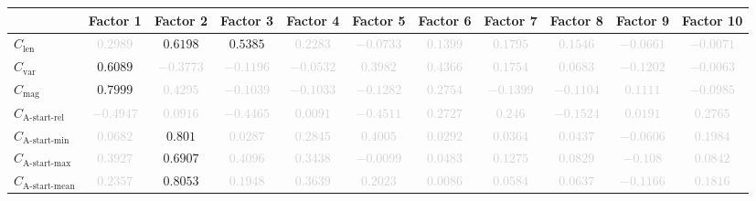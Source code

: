\documentclass{standalone}
\newcommand{\magnitudename}{\text{mag}}
\newcommand{\magnitude}{C_{\magnitudename}}
\newcommand{\varietyname}{\text{var}}
\newcommand{\variety}{C_{\varietyname}}
\newcommand{\lengthname}{\text{len}}
\newcommand{\length}{C_{\lengthname}}
\newcommand{\startactivitiesrelname}{\text{A-start-rel}}
\newcommand{\startactivitiesrel}{C_{\startactivitiesrelname}}
\newcommand{\startminname}{\text{A-start-min}}
\newcommand{\startmin}{C_{\startminname}}
\newcommand{\startmaxname}{\text{A-start-max}}
\newcommand{\startmax}{C_{\startmaxname}}
\newcommand{\startmeanname}{\text{A-start-mean}}
\newcommand{\startmean}{C_{\startmeanname}}
\begin{document}
\begin{tabular}{lcccccccccc} \toprule 
 & \textbf{Factor 1} & \textbf{Factor 2} & \textbf{Factor 3} & \textbf{Factor 4} & \textbf{Factor 5} & \textbf{Factor 6} & \textbf{Factor 7} & \textbf{Factor 8} & \textbf{Factor 9} & \textbf{Factor 10} \\ \midrule 
$\length$ & \textcolor{lightgray}{$0.2989$} & $0.6198$ & $0.5385$ & \textcolor{lightgray}{$0.2283$} & \textcolor{lightgray}{$-0.0733$} & \textcolor{lightgray}{$0.1399$} & \textcolor{lightgray}{$0.1795$} & \textcolor{lightgray}{$0.1546$} & \textcolor{lightgray}{$-0.0661$} & \textcolor{lightgray}{$-0.0071$} \\ 
$\variety$ & $0.6089$ & \textcolor{lightgray}{$-0.3773$} & \textcolor{lightgray}{$-0.1196$} & \textcolor{lightgray}{$-0.0532$} & \textcolor{lightgray}{$0.3982$} & \textcolor{lightgray}{$0.4366$} & \textcolor{lightgray}{$0.1754$} & \textcolor{lightgray}{$0.0683$} & \textcolor{lightgray}{$-0.1202$} & \textcolor{lightgray}{$-0.0063$} \\ 
$\magnitude$ & $0.7999$ & \textcolor{lightgray}{$0.4295$} & \textcolor{lightgray}{$-0.1039$} & \textcolor{lightgray}{$-0.1033$} & \textcolor{lightgray}{$-0.1282$} & \textcolor{lightgray}{$0.2754$} & \textcolor{lightgray}{$-0.1399$} & \textcolor{lightgray}{$-0.1104$} & \textcolor{lightgray}{$0.1111$} & \textcolor{lightgray}{$-0.0985$} \\ 
$\startactivitiesrel$ & \textcolor{lightgray}{$-0.4947$} & \textcolor{lightgray}{$0.0916$} & \textcolor{lightgray}{$-0.4465$} & \textcolor{lightgray}{$0.0091$} & \textcolor{lightgray}{$-0.4511$} & \textcolor{lightgray}{$0.2727$} & \textcolor{lightgray}{$0.246$} & \textcolor{lightgray}{$-0.1524$} & \textcolor{lightgray}{$0.0191$} & \textcolor{lightgray}{$0.2765$} \\ 
$\startmin$ & \textcolor{lightgray}{$0.0682$} & $0.801$ & \textcolor{lightgray}{$0.0287$} & \textcolor{lightgray}{$0.2845$} & \textcolor{lightgray}{$0.4005$} & \textcolor{lightgray}{$0.0292$} & \textcolor{lightgray}{$0.0364$} & \textcolor{lightgray}{$0.0437$} & \textcolor{lightgray}{$-0.0606$} & \textcolor{lightgray}{$0.1984$} \\ 
$\startmax$ & \textcolor{lightgray}{$0.3927$} & $0.6907$ & \textcolor{lightgray}{$0.4096$} & \textcolor{lightgray}{$0.3438$} & \textcolor{lightgray}{$-0.0099$} & \textcolor{lightgray}{$0.0483$} & \textcolor{lightgray}{$0.1275$} & \textcolor{lightgray}{$0.0829$} & \textcolor{lightgray}{$-0.108$} & \textcolor{lightgray}{$0.0842$} \\ 
$\startmean$ & \textcolor{lightgray}{$0.2357$} & $0.8053$ & \textcolor{lightgray}{$0.1948$} & \textcolor{lightgray}{$0.3639$} & \textcolor{lightgray}{$0.2023$} & \textcolor{lightgray}{$0.0086$} & \textcolor{lightgray}{$0.0584$} & \textcolor{lightgray}{$0.0637$} & \textcolor{lightgray}{$-0.1166$} & \textcolor{lightgray}{$0.1816$} \\ 

\end{tabular}
\end{document}
